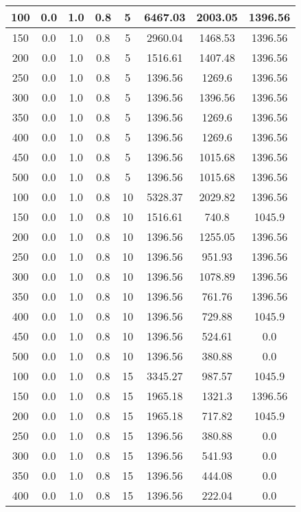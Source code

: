 \documentclass[a4paper, 12pt]{extreport}
\begin{document}
\begin{itemize}
\begin{longtable}{|c|c|c|c|c|c|c|c|}
			100 & 0.0 & 1.0 & 0.8 & 5 & 6467.03 & 2003.05 & 1396.56 \\\hline
			150 & 0.0 & 1.0 & 0.8 & 5 & 2960.04 & 1468.53 & 1396.56 \\\hline
			200 & 0.0 & 1.0 & 0.8 & 5 & 1516.61 & 1407.48 & 1396.56 \\\hline
			250 & 0.0 & 1.0 & 0.8 & 5 & 1396.56 & 1269.6 & 1396.56 \\\hline
			300 & 0.0 & 1.0 & 0.8 & 5 & 1396.56 & 1396.56 & 1396.56 \\\hline
			350 & 0.0 & 1.0 & 0.8 & 5 & 1396.56 & 1269.6 & 1396.56 \\\hline
			400 & 0.0 & 1.0 & 0.8 & 5 & 1396.56 & 1269.6 & 1396.56 \\\hline
			450 & 0.0 & 1.0 & 0.8 & 5 & 1396.56 & 1015.68 & 1396.56 \\\hline
			500 & 0.0 & 1.0 & 0.8 & 5 & 1396.56 & 1015.68 & 1396.56 \\\hline
			100 & 0.0 & 1.0 & 0.8 & 10 & 5328.37 & 2029.82 & 1396.56 \\\hline
			150 & 0.0 & 1.0 & 0.8 & 10 & 1516.61 & 740.8 & 1045.9 \\\hline
			200 & 0.0 & 1.0 & 0.8 & 10 & 1396.56 & 1255.05 & 1396.56 \\\hline
			250 & 0.0 & 1.0 & 0.8 & 10 & 1396.56 & 951.93 & 1396.56 \\\hline
			300 & 0.0 & 1.0 & 0.8 & 10 & 1396.56 & 1078.89 & 1396.56 \\\hline
			350 & 0.0 & 1.0 & 0.8 & 10 & 1396.56 & 761.76 & 1396.56 \\\hline
			400 & 0.0 & 1.0 & 0.8 & 10 & 1396.56 & 729.88 & 1045.9 \\\hline
			450 & 0.0 & 1.0 & 0.8 & 10 & 1396.56 & 524.61 & 0.0 \\\hline
			500 & 0.0 & 1.0 & 0.8 & 10 & 1396.56 & 380.88 & 0.0 \\\hline
			100 & 0.0 & 1.0 & 0.8 & 15 & 3345.27 & 987.57 & 1045.9 \\\hline
			150 & 0.0 & 1.0 & 0.8 & 15 & 1965.18 & 1321.3 & 1396.56 \\\hline
			200 & 0.0 & 1.0 & 0.8 & 15 & 1965.18 & 717.82 & 1045.9 \\\hline
			250 & 0.0 & 1.0 & 0.8 & 15 & 1396.56 & 380.88 & 0.0 \\\hline
			300 & 0.0 & 1.0 & 0.8 & 15 & 1396.56 & 541.93 & 0.0 \\\hline
			350 & 0.0 & 1.0 & 0.8 & 15 & 1396.56 & 444.08 & 0.0 \\\hline
			400 & 0.0 & 1.0 & 0.8 & 15 & 1396.56 & 222.04 & 0.0 \\\hline

\end{longtable}
\end{itemize}
\end{document}
